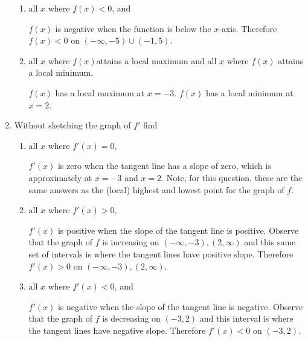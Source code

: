 \documentclass[nooutcomes]{ximera}
\begin{document}
\begin{problem}
\begin{enumerate}
\begin{enumerate}
        \item
          all $x$ where $f(x) < 0$, and
          \begin{freeResponse}
            $f(x)$ is negative when the function is below the $x$-axis.
            Therefore $f(x) < 0$ on $(-\infty ,-5) \cup (-1,5)$.
          \end{freeResponse}

        \item
          all $x$ where $f(x)$attains a local maximum and all $x$ where $f(x)$ attains a local minimum.
          \begin{freeResponse}
            $f(x)$ has a local maximum at $x=-3$.
            $f(x)$ has a local minimum at $x=2$.
          \end{freeResponse}
      \end{enumerate}

    \item

      Without sketching the graph of $f'$ find
      \begin{enumerate}
        \item 
          all $x$ where $f'(x) = 0$,
          \begin{freeResponse}
            $f'(x)$ is zero when the tangent line has a slope of zero, which is approximately at $x=-3$ and $x=2$.
            Note, for this question, these are the same answers as the (local) highest and lowest point for the graph of $f$.   
          \end{freeResponse}

        \item
          all $x$ where $f'(x) > 0$,
          \begin{freeResponse}
            ${f}'(x)$ is positive when the slope of the tangent line is positive.
            Observe that the graph of $f$ is increasing on $(-\infty ,-3), (2,\infty)$ and this same set of intervals is where the tangent lines have positive slope.
            Therefore $f'(x) > 0$ on $(-\infty ,-3), (2,\infty)$.
          \end{freeResponse}
        
        \item
          all $x$ where $f'(x) < 0$, and
          \begin{freeResponse}
            ${f}'(x)$ is negative when the slope of the tangent line is negative.
            Observe that the graph of $f$ is decreasing on $(-3,2)$ and this interval is where the tangent lines have negative slope.
            Therefore $f'(x) < 0$ on $(-3,2)$.
          \end{freeResponse}


\end{enumerate}
\end{enumerate}
\end{problem}
\end{document}
